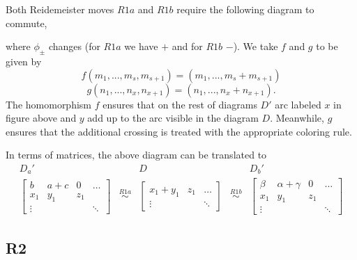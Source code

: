 Both Reidemeister moves $R1a$ and $R1b$ require the following diagram to commute,
\begin{center}
\end{center}
where $\phi_\pm$ changes (for $R1a$ we have $+$ and for $R1b$ $-$). We take $f$ and $g$ to be given by
$$f(m_1,..., m_s, m_{s+1})=(m_1,..., m_s+m_{s+1})$$
$$g(n_1,..., n_x, n_{x+1})=(n_1,..., n_x+n_{x+1}).$$
The homomorphism $f$ ensures that on the rest of diagrams $D'$ arc labeled $x$ in figure above and $y$ add up to the arc visible in the diagram $D$. Meanwhile, $g$ ensures that the additional crossing is treated with the appropriate coloring rule.

In terms of matrices, the above diagram can be translated to
$$
\begin{matrix}
  D_a' & & D & & D_b'\\ 
  \begin{bmatrix}
    b & a+c  & 0 & \hdots\\ 
    x_1 & y_1 & z_1 \\ 
    \vdots & & & \ddots
  \end{bmatrix} 
       & \overset{R1a}{\sim} &
     \begin{bmatrix}
       x_1 + y_1 & z_1 & \hdots\\ 
       \vdots & & \ddots
     \end{bmatrix} 
       & \overset{R1b}{\sim} &
  \begin{bmatrix}
    \beta & \alpha+\gamma  & 0 & \hdots\\ 
    x_1 & y_1 & z_1 \\ 
    \vdots & & & \ddots
  \end{bmatrix} 
\end{matrix}
$$

\subsection*{\centering R2}

